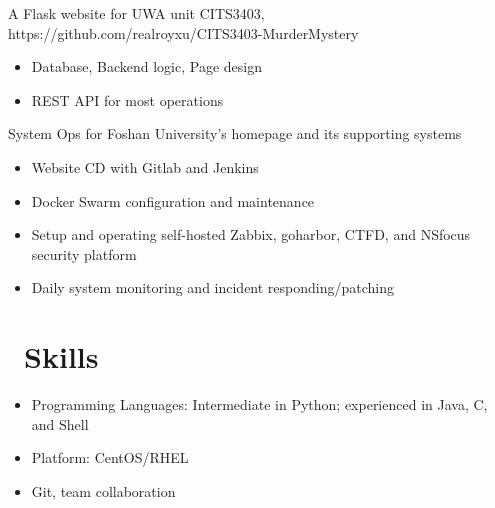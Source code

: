 \documentclass{resume}
\begin{document}
A Flask website for UWA unit CITS3403, https://github.com/realroyxu/CITS3403-MurderMystery
\begin{itemize}
  \item Database, Backend logic, Page design
  \item REST API for most operations
\end{itemize}

System Ops for Foshan University's homepage and its supporting systems
\begin{itemize}
  \item Website CD with Gitlab and Jenkins
  \item Docker Swarm configuration and maintenance
  \item Setup and operating self-hosted Zabbix, goharbor, CTFD, and NSfocus security platform
  \item Daily system monitoring and incident responding/patching
\end{itemize}


\section{\faCogs\ Skills}
\begin{itemize}[parsep=0.5ex]
  \item Programming Languages: Intermediate in Python; experienced in Java, C, and Shell
  \item Platform: CentOS/RHEL
  \item Git, team collaboration
\end{itemize}

\end{document}
